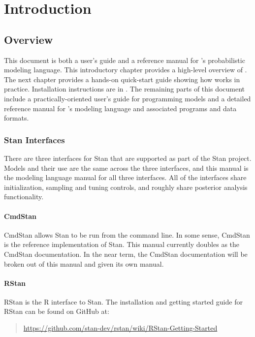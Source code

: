 \part{Introduction}


\chapter{Overview}

\noindent
This document is both a user's guide and a reference manual for
\Stan's probabilistic modeling language.  This introductory chapter
provides a high-level overview of \Stan.  The next chapter provides a
hands-on quick-start guide showing how \Stan works in practice.
Installation instructions are in . The remaining
parts of this document include a practically-oriented user's guide for
programming models and a detailed reference manual for \Stan's
modeling language and associated programs and data formats.

\section{Stan Interfaces}

There are three interfaces for Stan that are supported as part of the
Stan project.  Models and their use are the same across the three
interfaces, and this manual is the modeling language manual for all
three interfaces.  All of the interfaces share initialization,
sampling and tuning controls, and roughly share posterior analysis
functionality.   

\subsection{CmdStan}

CmdStan allows Stan to be run from the command line.  In some sense,
CmdStan is the reference implementation of Stan.  This manual
currently doubles as the CmdStan documentation.  In the near term,
the CmdStan documentation will be broken out of this manual and given
its own manual.

\subsection{RStan}

RStan is the R interface to Stan.  The installation and getting
started guide for RStan can be found on GitHub at:

\begin{quote}
\url{https://github.com/stan-dev/rstan/wiki/RStan-Getting-Started}
\end{quote}

